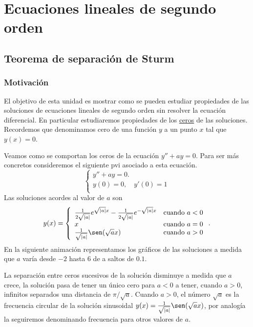 
\chapter{Ecuaciones lineales de segundo orden}


\section{Teorema de separación de Sturm}
\subsection{Motivación}


El objetivo  de esta unidad es mostrar como se pueden estudiar propiedades de las soluciones de ecuaciones lineales de segundo orden sin resolver la ecuación diferencial. En particular estudiaremos propiedades de  los \href{http://es.wikipedia.org/wiki/Raíz_de_una_función}{ceros} de las soluciones. Recordemos que denominamos cero de una función $y$ a un punto $x$ tal que $y(x)=0$.

Veamos como se comportan los ceros de la ecuación $y''+ay=0$. Para ser más concretos consideremos el siguiente pvi asociado a esta ecuación.
\[\left\{\begin{array}{l}
    y''+ay=0.\\
    y(0)=0,\quad y'(0)=1\\
  \end{array}\right.
  \]
Las soluciones  acordes al valor de $a$ son
\[
y(x)=\left\{\begin{array}{l l}
    \frac{1}{2\sqrt{|a|}}e^{\sqrt{|a|}x}- \frac{1}{2\sqrt{|a|}}e^{-\sqrt{|a|}x} &\text{cuando } a<0\\
     x &\text{cuando } a=0\\
     \frac{1}{\sqrt{|a|}}\sen(\sqrt{a}x) &\text{cuando } a>0\\
\end{array}\right..
\]
En la siguiente animación representamos los gráficos de las soluciones a medida que $a$ varía desde $-2$ hasta $6$ de a saltos de $0.1$.  
\begin{center}
\end{center}
La separación entre ceros sucesivos de la  solución disminuye a medida que $a$ crece, la solución pasa de tener un único cero para $a<0$  a tener, cuando $a>0$, infinitos separados una distancia de $\pi/\sqrt{a}$. Cuando $a>0$, el número $\sqrt{a}$ es la frecuencia circular  de la solución sinusoidal $y(x)=   \frac{1}{\sqrt{|a|}}\sen(\sqrt{a}x)$, por analogía la seguiremos denominando frecuencia para otros valores de $a$.

